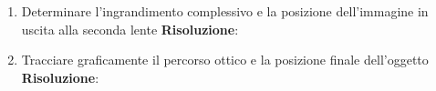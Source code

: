 \documentclass{article}
\begin{document}
\begin{enumerate}
    \begin{enumerate}
        
        \item Determinare l’ingrandimento complessivo e la posizione
        dell’immagine in uscita alla seconda lente
        \newline 
        \textbf{Risoluzione}:

        \item Tracciare graficamente il percorso ottico e la posizione finale dell’oggetto
        \newline 
        \textbf{Risoluzione}:

    \end{enumerate}

\end{enumerate}
\end{document}
